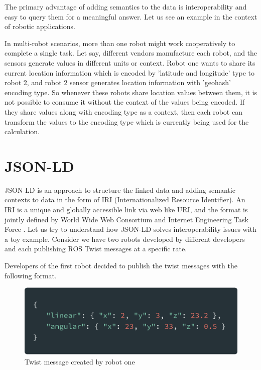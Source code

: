 		The primary advantage of adding semantics to the data is interoperability and easy to query them for a meaningful answer. Let us see an example in the context of robotic applications.
		
		In multi-robot scenarios, more than one robot might work cooperatively to complete a single task. Let say, different vendors manufacture each robot, and the sensors generate values in different units or context. Robot one wants to share its current location information which is encoded by 'latitude and longitude' type to robot 2, and robot 2 sensor generates location information with 'geohash' encoding type. So whenever these robots share location values between them, it is not possible to consume it without the context of the values being encoded. If they share values along with encoding type as a context, then each robot can transform the values to the encoding type which is currently being used for the calculation.
		
		\section{JSON-LD}
		
		
		JSON-LD is an approach to structure the linked data and adding semantic contexts to data in the form of IRI (Internationalized Resource Identifier). An IRI is a unique and globally accessible link via web like URI, and the format is jointly defined by World Wide Web Consortium and Internet Engineering Task Force \cite{misc07}. Let us try to understand how JSON-LD solves interoperability issues with a toy example. Consider we have two robots developed by different developers and each publishing ROS Twist messages at a specific rate.
		
		Developers of the first robot decided to publish the twist messages with the following format.
		
		\begin{figure}[!htbp] 
			\begin{center}
				\includegraphics[scale=0.1]{./images/png/jsonld/1}	
				\caption{Twist message created by robot one}	
				\label{fig:jsonld_1}	
			\end{center}
		\end{figure}
	
